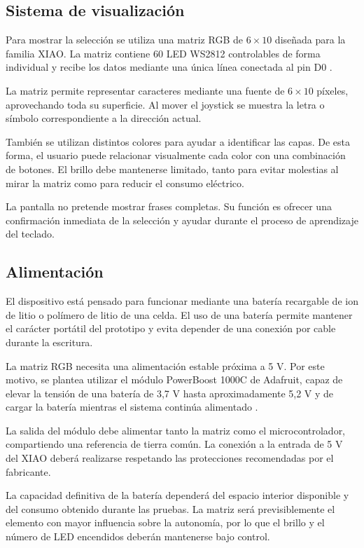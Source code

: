 \subsection{Sistema de visualización}
\label{subsec:sistema-visualizacion}

Para mostrar la selección se utiliza una matriz RGB de \(6 \times 10\) diseñada para la familia XIAO. La matriz contiene 60 LED WS2812 controlables de forma individual y recibe los datos mediante una única línea conectada al pin D0 \cite{seeedRGBMatrix}.

La matriz permite representar caracteres mediante una fuente de \(6 \times 10\) píxeles, aprovechando toda su superficie. Al mover el joystick se muestra la letra o símbolo correspondiente a la dirección actual.

También se utilizan distintos colores para ayudar a identificar las capas. De esta forma, el usuario puede relacionar visualmente cada color con una combinación de botones. El brillo debe mantenerse limitado, tanto para evitar molestias al mirar la matriz como para reducir el consumo eléctrico.

La pantalla no pretende mostrar frases completas. Su función es ofrecer una confirmación inmediata de la selección y ayudar durante el proceso de aprendizaje del teclado.

\subsection{Alimentación}
\label{subsec:alimentacion}

El dispositivo está pensado para funcionar mediante una batería recargable de ion de litio o polímero de litio de una celda. El uso de una batería permite mantener el carácter portátil del prototipo y evita depender de una conexión por cable durante la escritura.

La matriz RGB necesita una alimentación estable próxima a 5 V. Por este motivo, se plantea utilizar el módulo PowerBoost 1000C de Adafruit, capaz de elevar la tensión de una batería de 3,7 V hasta aproximadamente 5,2 V y de cargar la batería mientras el sistema continúa alimentado \cite{adafruitPowerBoost1000C}.

La salida del módulo debe alimentar tanto la matriz como el microcontrolador, compartiendo una referencia de tierra común. La conexión a la entrada de 5 V del XIAO deberá realizarse respetando las protecciones recomendadas por el fabricante.

La capacidad definitiva de la batería dependerá del espacio interior disponible y del consumo obtenido durante las pruebas. La matriz será previsiblemente el elemento con mayor influencia sobre la autonomía, por lo que el brillo y el número de LED encendidos deberán mantenerse bajo control.

